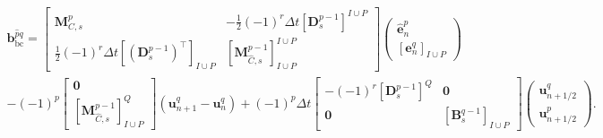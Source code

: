 \documentclass{elsarticle}
\newcommand*{\dual}[1]{\ensuremath{\widehat{#1}}}
\begin{document}
\begin{equation}
\begin{aligned}
\mathbf{b}^{\dual{p}q}_{\mathrm{bc}} = \begin{bmatrix}
        \mathbf{M}^p_{C, s} & -\frac{1}{2}(-1)^r\Delta t[\mathbf{D}^{p-1}_s]^{I\cup P} \\
        \frac{1}{2}(-1)^r\Delta t [(\mathbf{D}_{s}^{p-1})^\top]_{I\cup P} & [\mathbf{M}^{p-1}_{\dual{C}, s}]_{I\cup P}^{I\cup P}
    \end{bmatrix}\begin{pmatrix}
    \dual{\mathbf{e}}^p_n \\
    [\mathbf{e}^q_n]_{I\cup P}
    \end{pmatrix} \\
    - (-1)^p
    \begin{bmatrix}
         \mathbf{0} \\
        [\mathbf{M}^{p-1}_{\dual{C}, s}]_{I\cup P}^{Q}
    \end{bmatrix}(\mathbf{u}^q_{n+1} - \mathbf{u}^q_{n}) 
    + (-1)^p\Delta t \begin{bmatrix}
        -(-1)^r [\mathbf{D}^{p-1}_s]^{Q} & \mathbf{0}\\
        \mathbf{0} & [\mathbf{B}^{q-1}_{s}]_{I \cup P}
    \end{bmatrix}
    \begin{pmatrix}
        \mathbf{u}^q_{n+1/2} \\
        \mathbf{u}^p_{n+1/2}
    \end{pmatrix}.
\end{aligned}
\end{equation}
\end{document}

